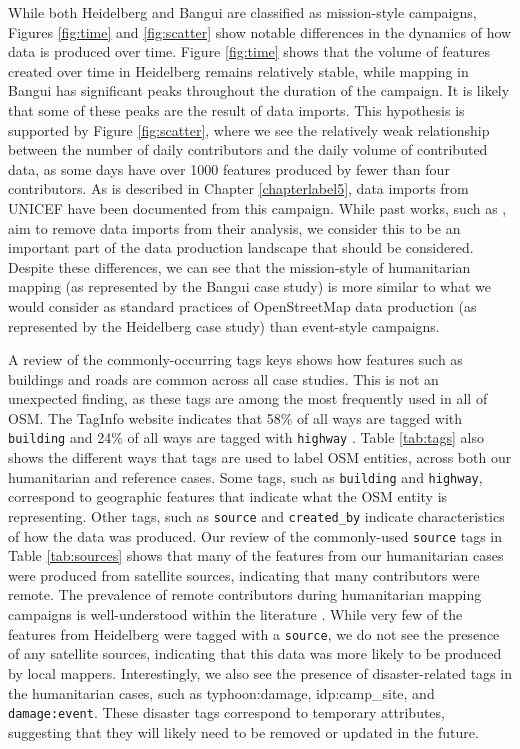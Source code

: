 While both Heidelberg and Bangui are classified as mission-style campaigns, Figures \ref{fig:time} and \ref{fig:scatter} show notable differences in the dynamics of how data is produced over time. Figure \ref{fig:time} shows that the volume of features created over time in Heidelberg remains relatively stable, while mapping in Bangui has significant peaks throughout the duration of the campaign. It is likely that some of these peaks are the result of data imports. This hypothesis is supported by Figure \ref{fig:scatter}, where we see the relatively weak relationship between the number of daily contributors and the daily volume of contributed data, as some days have over 1000 features produced by fewer than four contributors. As is described in Chapter \ref{chapterlabel5}, data imports from UNICEF have been documented from this campaign. While past works, such as \textcite{ahmouda_analyzing_2018}, aim to remove data imports from their analysis, we consider this to be an important part of the data production landscape that should be considered. Despite these differences, we can see that the mission-style of humanitarian mapping (as represented by the Bangui case study) is more similar to what we would consider as standard practices of OpenStreetMap data production (as represented by the Heidelberg case study) than event-style campaigns.

A review of the commonly-occurring tags keys shows how features such as buildings and roads are common across all case studies. This is not an unexpected finding, as these tags are among the most frequently used in all of OSM. The TagInfo website indicates that 58\% of all ways are tagged with \texttt{building} and 24\% of all ways are tagged with \texttt{highway} \parencite{noauthor_openstreetmap_2020}. Table \ref{tab:tags} also shows the different ways that tags are used to label OSM entities, across both our humanitarian and reference cases. Some tags, such as \texttt{building} and \texttt{highway}, correspond to geographic features that indicate what the OSM entity is representing. Other tags, such as \texttt{source} and \texttt{created_by} indicate characteristics of how the data was produced. Our review of the commonly-used \texttt{source} tags in Table \ref{tab:sources} shows that many of the features from our humanitarian cases were produced from satellite sources, indicating that many contributors were remote. The prevalence of remote contributors during humanitarian mapping campaigns is well-understood within the literature \parencite{dittus_mass_2017, eckle_quality_2015}. While very few of the features from Heidelberg were tagged with a \texttt{source}, we do not see the presence of any satellite sources, indicating that this data was more likely to be produced by local mappers. Interestingly, we also see the presence of disaster-related tags in the humanitarian cases, such as \texttt{}{typhoon:damage, idp:camp_site}, and \texttt{damage:event}. These disaster tags correspond to temporary attributes, suggesting that they will likely need to be removed or updated in the future. \\

